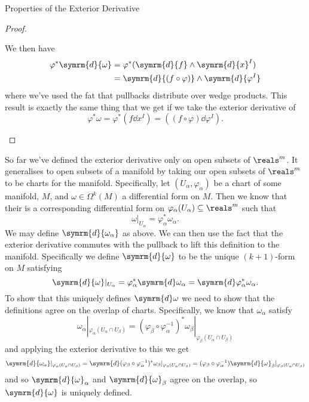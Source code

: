 \documentclass[fleqn]{NotesClass}
\renewcommand{\dl}{\symrm{d}}
\begin{document}
\begin{lma}{Properties of the Exterior Derivative}{}
\begin{proof}
\begin{itemize}
                We then have
                \begin{align}
                    \varphi^*\dl{\omega} &= \varphi^*(\dl{f} \wedge \dl{x}^I)\\
                    &= \dl{(f \circ \varphi)} \wedge \dl{\varphi^{I}}
                \end{align}
                where we've used the fat that pullbacks distribute over wedge products.
                This result is exactly the same thing that we get if we take the exterior derivative of
                \begin{equation}
                    \varphi^*\omega = \varphi^*(f \dd{x}^I) = ((f \circ \varphi) \dd{\varphi}^I).
                \end{equation}
            \end{itemize}
        \end{proof}
    \end{lma}
    
    So far we've defined the exterior derivative only on open subsets of \(\reals^m\).
    It generalises to open subsets of a manifold by taking our open subsets of \(\reals^m\) to be charts for the manifold.
    Specifically, let \((U_\alpha, \varphi_\alpha)\) be a chart of some manifold, \(M\), and \(\omega \in \Omega^k(M)\) a differential form on \(M\).
    Then we know that their is a corresponding differential form on \(\varphi_\alpha(U_\alpha) \subseteq \reals^m\) such that
    \begin{equation}
        \omega|_{U_\alpha} = \varphi_\alpha^*\omega_\alpha.
    \end{equation}
    We may define \(\dl{\omega_\alpha}\) as above.
    We can then use the fact that the exterior derivative commutes with the pullback to lift this definition to the manifold.
    Specifically we define \(\dl{\omega}\) to be the unique \((k+1)\)-form on \(M\) satisfying
    \begin{equation}
        \dl{\omega}|_{U_\alpha} = \varphi^*_\alpha\dl\omega_\alpha = \dl \varphi_\alpha^* \omega_\alpha.
    \end{equation}
    To show that this uniquely defines \(\dl\omega\) we need to show that the definitions agree on the overlap of charts.
    Specifically, we know that \(\omega_\alpha\) satisfy
    \begin{equation}
        \omega_\alpha|_{\varphi_\alpha(U_\alpha \cap U_\beta)} = (\varphi_\beta \circ \varphi_\alpha^{-1})^* \omega_\beta|_{\varphi_\beta(U_\alpha \cap U_\beta)}
    \end{equation}
    and applying the exterior derivative to this we get
    \begin{equation}
        \dl{\omega_\alpha}|_{\varphi_\alpha(U_\alpha \cap U_\beta)} = \dl (\varphi_\beta \circ \varphi_\alpha^{-1})^* \omega_\beta |_{\varphi_\beta(U_\alpha \cap U_\beta)} = (\varphi_\beta \circ \varphi_\alpha^{-1}) \dl{\omega}_\beta|_{\varphi_\beta(U_\alpha \cap U_\beta)}
    \end{equation}
    and so \(\dl{\omega}_\alpha\) and \(\dl{\omega}_\beta\) agree on the overlap, so \(\dl{\omega}\) is uniquely defined.
    
\end{document}
